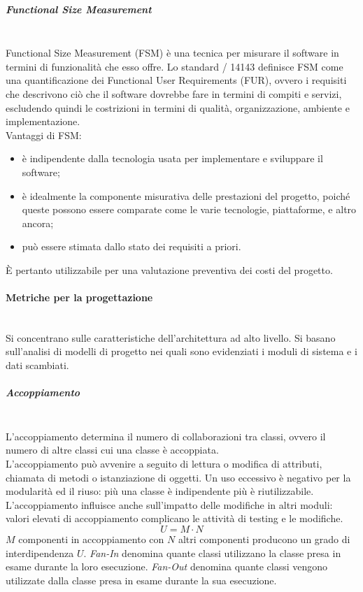 \subparagraph{Functional Size Measurement}\mbox{}\\
Functional Size Measurement (FSM) è una tecnica per misurare il software in termini di funzionalità che esso offre. Lo standard / 14143 definisce FSM come una quantificazione dei Functional User Requirements (FUR), ovvero i requisiti che descrivono ciò che il software dovrebbe fare in termini di compiti e servizi, escludendo quindi le costrizioni in termini di qualità, organizzazione, ambiente e implementazione.\\
Vantaggi di FSM:
\begin{itemize}
 	\item è indipendente dalla tecnologia usata per implementare e sviluppare il software;
 	\item è idealmente la componente misurativa delle prestazioni del progetto, poiché queste possono essere comparate come le varie tecnologie, piattaforme, e altro ancora;
 	\item può essere stimata dallo stato dei requisiti a priori.
\end{itemize}
\`{E} pertanto utilizzabile per una valutazione preventiva dei costi del progetto.

\paragraph{Metriche per la progettazione}\mbox{}\\
Si concentrano sulle caratteristiche dell'architettura ad alto livello. Si basano sull'analisi di modelli di progetto nei quali sono evidenziati i moduli di sistema e i dati scambiati.

\subparagraph{Accoppiamento}\mbox{}\\
L'accoppiamento determina il numero di collaborazioni tra classi, ovvero il numero di altre classi cui una classe è accoppiata.\\
L'accoppiamento può avvenire a seguito di lettura o modifica di attributi, chiamata di metodi o istanziazione di oggetti. Un uso eccessivo è negativo per la modularità ed il riuso: più una classe è indipendente più è riutilizzabile. L'accoppiamento influisce anche sull'impatto delle modifiche in altri moduli: valori elevati di accoppiamento complicano le attività di testing e le modifiche.
\[ U = M \cdot N \]
$M$ componenti in accoppiamento con $N$ altri componenti producono un grado di interdipendenza $U$.
\textit{Fan-In} denomina quante classi utilizzano la classe presa in esame durante la loro esecuzione. 
\textit{Fan-Out} denomina quante classi vengono utilizzate dalla classe presa in esame durante la sua esecuzione.

